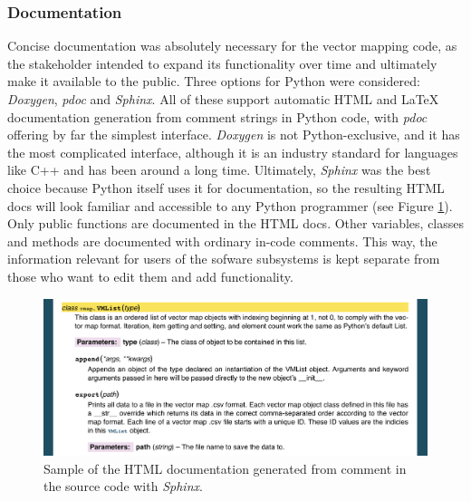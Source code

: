 \documentclass[12pt,twoside]{article}
\begin{document}
\subsubsection{Documentation}
Concise documentation was absolutely necessary for the vector mapping code, as the stakeholder intended to expand its functionality over time and ultimately make it available to the public. Three options for Python were considered: \textit{Doxygen}, \textit{pdoc} and \textit{Sphinx}. All of these support automatic HTML and LaTeX documentation generation from comment strings in Python code, with \textit{pdoc} offering by far the simplest interface. \textit{Doxygen} is not Python-exclusive, and it has the most complicated interface, although it is an industry standard for languages like C++ and has been around a long time. Ultimately, \textit{Sphinx} was the best choice because Python itself uses it for documentation, so the resulting HTML docs will look familiar and accessible to any Python programmer (see Figure \ref{fig:doc}). Only public functions are documented in the HTML docs. Other variables, classes and methods are documented with ordinary in-code comments. This way, the information relevant for users of the sofware subsystems is kept separate from those who want to edit them and add functionality.

\begin{figure}[ht]
    \centering
    \includegraphics[width=16cm,keepaspectratio]{doc.png}
    \caption{Sample of the HTML documentation generated from comment in the source code with \textit{Sphinx}.}
    \label{fig:doc}
\end{figure}
\end{document}
